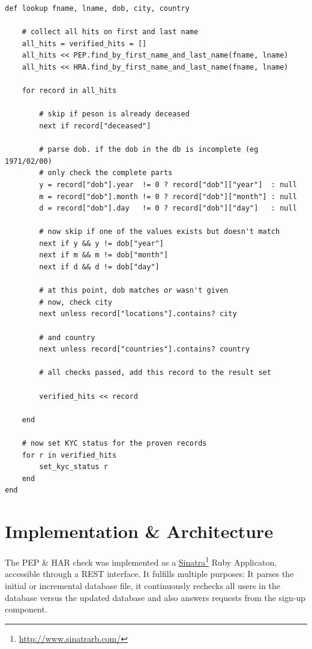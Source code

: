 \documentclass[a4paper, oneside]{csthesis}
\newcommand\fnurl[2]{%
  \href{#2}{#1}\footnote{\url{#2}}%
}
\begin{document}
\begin{lstlisting}[caption={The Lookup algorithm},label={lst:world-check-lookup}]
def lookup fname, lname, dob, city, country

    # collect all hits on first and last name
    all_hits = verified_hits = []
    all_hits << PEP.find_by_first_name_and_last_name(fname, lname)
    all_hits << HRA.find_by_first_name_and_last_name(fname, lname)

    for record in all_hits

        # skip if peson is already deceased
        next if record["deceased"]

        # parse dob. if the dob in the db is incomplete (eg 1971/02/00)
        # only check the complete parts
        y = record["dob"].year  != 0 ? record["dob"]["year"]  : null
        m = record["dob"].month != 0 ? record["dob"]["month"] : null
        d = record["dob"].day   != 0 ? record["dob"]["day"]   : null

        # now skip if one of the values exists but doesn't match
        next if y && y != dob["year"]
        next if m && m != dob["month"]
        next if d && d != dob["day"]

        # at this point, dob matches or wasn't given
        # now, check city
        next unless record["locations"].contains? city

        # and country
        next unless record["countries"].contains? country

        # all checks passed, add this record to the result set

        verified_hits << record

    end

    # now set KYC status for the proven records
    for r in verified_hits
        set_kyc_status r
    end
end
\end{lstlisting}


\section{Implementation \& Architecture}

The PEP \& HAR check was implemented as a \fnurl{Sinatra}{http://www.sinatrarb.com/} Ruby Applicaton, accessible through a REST interface. It fulfills multiple purposes: It parses the initial or incremental database file, it continuously rechecks all users in the database versus the updated database and also answers requests from the sign-up component.
\end{document}
